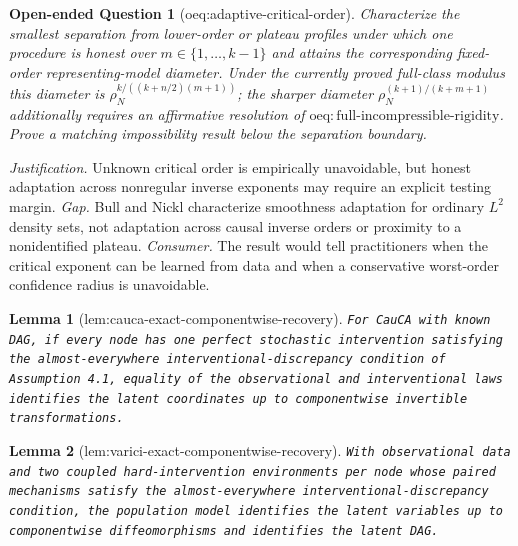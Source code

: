 \documentclass{article}
\newtheorem{lemma}{Lemma}
\newtheorem{openendedquestion}{Open-ended Question}
\begin{document}
\begin{openendedquestion}[oeq:adaptive-critical-order]\label{oeq:adaptive-critical-order}
Characterize the smallest separation from lower-order or plateau profiles under which one procedure is honest over \(m\in\{1,\ldots,k-1\}\) and attains the corresponding fixed-order representing-model diameter. Under the currently proved full-class modulus this diameter is \(\rho_N^{k/((k+n/2)(m+1))}\); the sharper diameter \(\rho_N^{(k+1)/(k+m+1)}\) additionally requires an affirmative resolution of \(\mathrm{oeq:full\text{-}incompressible\text{-}rigidity}\). Prove a matching impossibility result below the separation boundary.
\end{openendedquestion}
\par\smallskip\noindent \textit{Justification.} Unknown critical order is empirically unavoidable, but honest adaptation across nonregular inverse exponents may require an explicit testing margin. \textit{Gap.} Bull and Nickl characterize smoothness adaptation for ordinary \(L^2\) density sets, not adaptation across causal inverse orders or proximity to a nonidentified plateau. \textit{Consumer.} The result would tell practitioners when the critical exponent can be learned from data and when a conservative worst-order confidence radius is unavoidable.

\begin{lemma}[lem:cauca-exact-componentwise-recovery]\label{lem:cauca-exact-componentwise-recovery}
\texttt{For CauCA with known DAG,\allowbreak{} if every node has one perfect stochastic intervention satisfying the almost-\allowbreak{}everywhere interventional-\allowbreak{}discrepancy condition of Assumption 4.1,\allowbreak{} equality of the observational and interventional laws identifies the latent coordinates up to componentwise invertible transformations.}
\end{lemma}

\begin{lemma}[lem:varici-exact-componentwise-recovery]\label{lem:varici-exact-componentwise-recovery}
\texttt{With observational data and two coupled hard-\allowbreak{}intervention environments per node whose paired mechanisms satisfy the almost-\allowbreak{}everywhere interventional-\allowbreak{}discrepancy condition,\allowbreak{} the population model identifies the latent variables up to componentwise diffeomorphisms and identifies the latent DAG.}
\end{lemma}
\end{document}

